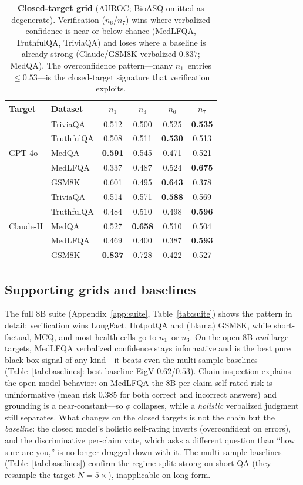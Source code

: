 \documentclass[11pt]{article}
\newcommand{\nverb}{$n_1$}     %
\newcommand{\nphi}{$n_3$}      %
\newcommand{\nyn}{$n_6$}       %
\newcommand{\nsc}{$n_7$}       %
\begin{document}
\begin{table}[t]
\centering\small
\begin{tabular}{llcccc}
\toprule
Target & Dataset & \nverb & \nphi & \nyn & \nsc \\
\midrule
\multirow{5}{*}{GPT-4o}
 & TriviaQA   & 0.512 & 0.500 & 0.525 & \textbf{0.535} \\
 & TruthfulQA & 0.508 & 0.511 & \textbf{0.530} & 0.513 \\
 & MedQA      & \textbf{0.591} & 0.545 & 0.471 & 0.521 \\
 & MedLFQA    & 0.337 & 0.487 & 0.524 & \textbf{0.675} \\
 & GSM8K      & 0.601 & 0.495 & \textbf{0.643} & 0.378 \\
\midrule
\multirow{5}{*}{Claude-H}
 & TriviaQA   & 0.514 & 0.571 & \textbf{0.588} & 0.569 \\
 & TruthfulQA & 0.484 & 0.510 & 0.498 & \textbf{0.596} \\
 & MedQA      & 0.527 & \textbf{0.658} & 0.510 & 0.504 \\
 & MedLFQA    & 0.469 & 0.400 & 0.387 & \textbf{0.593} \\
 & GSM8K      & \textbf{0.837} & 0.728 & 0.422 & 0.527 \\
\bottomrule
\end{tabular}
\caption{\textbf{Closed-target grid} (AUROC; BioASQ omitted as degenerate). Verification
(\nyn/\nsc) wins where verbalized confidence is near or below chance (MedLFQA, TruthfulQA,
TriviaQA) and loses where a baseline is already strong (Claude/GSM8K verbalized $0.837$;
MedQA). The overconfidence pattern---many \nverb\ entries $\le 0.53$---is the closed-target
signature that verification exploits.}
\label{tab:closed}
\end{table}

\subsection{Supporting grids and baselines}
The full 8B suite (Appendix~\ref{app:suite}, Table~\ref{tab:suite}) shows the pattern in
detail: verification wins LongFact, HotpotQA and (Llama) GSM8K, while short-factual, MCQ,
and most health cells go to \nverb\ or \nphi. On the open 8B \emph{and} large targets, MedLFQA
verbalized confidence stays informative and is the best pure black-box signal of any kind---it
beats even the multi-sample baselines (Table~\ref{tab:baselines}: best baseline EigV
$0.62$/$0.53$). Chain inspection explains the open-model behavior: on MedLFQA the 8B per-claim
self-rated risk is uninformative (mean risk $0.385$ for both correct and incorrect answers) and
grounding is a near-constant---so $\phi$ collapses, while a \emph{holistic} verbalized judgment
still separates. What changes on the closed targets is not the chain but the \emph{baseline}:
the closed model's holistic self-rating inverts (overconfident on errors), and the discriminative
per-claim vote, which asks a different question than ``how sure are you,'' is no longer dragged
down with it. The multi-sample baselines (Table~\ref{tab:baselines}) confirm the regime split:
strong on short QA (they resample the target $N{=}5\times$), inapplicable on long-form.
\end{document}
